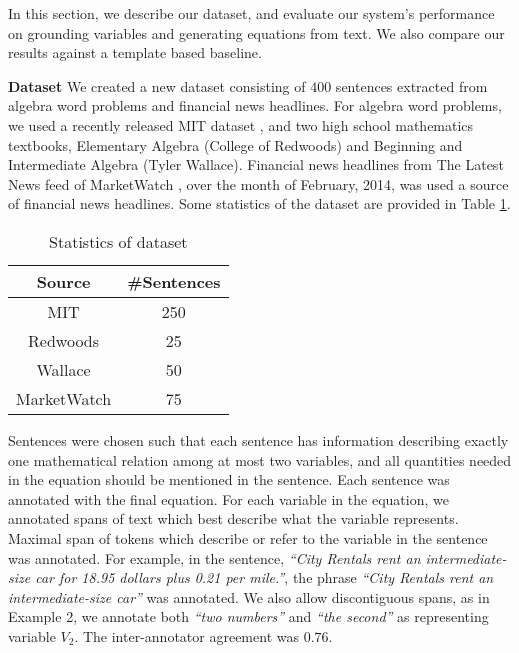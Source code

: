   In this section, we describe our dataset, and evaluate our system's
  performance on grounding variables and generating equations from
  text. We also compare our results against a template based baseline.

  \noindent \textbf{Dataset} We created a new dataset consisting of
  $400$ sentences extracted from algebra word problems and financial
  news headlines. For algebra word problems, we used a recently
  released MIT dataset \cite{KushmanZeBa14}, and two high school
  mathematics textbooks, Elementary Algebra (College of
  Redwoods) \cite{Redwoods} and Beginning and Intermediate Algebra
  (Tyler Wallace)\cite{Wallace}. Financial news headlines from The
  Latest News feed of MarketWatch \cite{MarketWatch}, over the month
  of February, 2014, was used a source of financial news
  headlines. Some statistics of the dataset are provided in
  Table \ref{tab:stats}.

  \setlength{\tabcolsep}{6pt}
      \begin{table}[!ht]
        \centering \small
        \begin{tabular}{|c|c|}
          \hline 
           Source & \#Sentences \\\hline
          \hline 
           MIT & 250  \\
           Redwoods & 25 \\
           Wallace & 50 \\
           MarketWatch & 75\\
          \hline
        \end{tabular}
        \caption{\footnotesize Statistics of dataset}
        \label{tab:stats}
      \end{table}


  Sentences were chosen such that each sentence has information
  describing exactly one mathematical relation among at most two
  variables, and all quantities needed in the equation should be
  mentioned in the sentence.  Each sentence was annotated with the
  final equation. For each variable in the equation, we annotated
  spans of text which best describe what the variable
  represents. Maximal span of tokens which describe or refer to the
  variable in the sentence was annotated. For example, in the
  sentence, {\em``City Rentals rent an intermediate-size car for 18.95
  dollars plus 0.21 per mile.''}, the phrase {\em ``City Rentals rent
  an intermediate-size car''} was annotated. We also allow
  discontiguous spans, as in Example 2, we annotate both {\em``two
  numbers''} and {\em``the second''} as representing variable
  $V_2$. The inter-annotator agreement was $0.76$.

